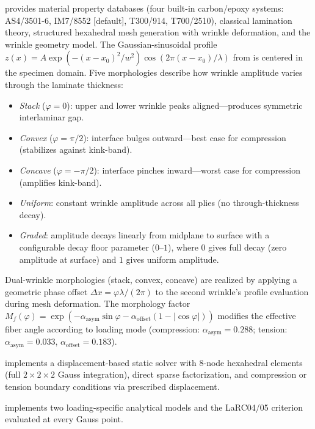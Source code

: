 \documentclass[10pt,a4paper]{article}
\begin{document}
\begin{description}[leftmargin=1.5em,labelindent=0em]
\item[Core] provides material property databases (four built-in carbon/epoxy systems: AS4/3501-6, IM7/8552 [default], T300/914, T700/2510), classical lamination theory, structured hexahedral mesh generation with wrinkle deformation, and the wrinkle geometry model.
The Gaussian-sinusoidal profile $z(x) = A \exp(-(x-x_0)^2/w^2)\cos(2\pi(x-x_0)/\lambda)$ from \citet{Jin2026} is centered in the specimen domain.
Five morphologies describe how wrinkle amplitude varies through the laminate thickness:
\begin{itemize}[nosep]
\item \textit{Stack} ($\varphi=0$): upper and lower wrinkle peaks aligned---produces symmetric interlaminar gap.
\item \textit{Convex} ($\varphi=\pi/2$): interface bulges outward---best case for compression (stabilizes against kink-band).
\item \textit{Concave} ($\varphi=-\pi/2$): interface pinches inward---worst case for compression (amplifies kink-band).
\item \textit{Uniform}: constant wrinkle amplitude across all plies (no through-thickness decay).
\item \textit{Graded}: amplitude decays linearly from midplane to surface with a configurable decay floor parameter ($0$--$1$), where $0$ gives full decay (zero amplitude at surface) and $1$ gives uniform amplitude.
\end{itemize}
Dual-wrinkle morphologies (stack, convex, concave) are realized by applying a geometric phase offset $\Delta x = \varphi\lambda/(2\pi)$ to the second wrinkle's profile evaluation during mesh deformation.
The morphology factor $M_f(\varphi) = \exp(-\alpha_{\text{asym}}\sin\varphi - \alpha_{\text{offset}}(1-|\cos\varphi|))$ modifies the effective fiber angle according to loading mode (compression: $\alpha_{\text{asym}}=0.288$; tension: $\alpha_{\text{asym}}=0.033$, $\alpha_{\text{offset}}=0.183$).

\item[Solver] implements a displacement-based static solver with 8-node hexahedral elements (full $2\times2\times2$ Gauss integration), direct sparse factorization, and compression or tension boundary conditions via prescribed displacement.

\item[Failure] implements two loading-specific analytical models and the LaRC04/05 criterion \citep{Pinho2005,DavilaCamanho2005} evaluated at every Gauss point.


\end{description}
\end{document}
